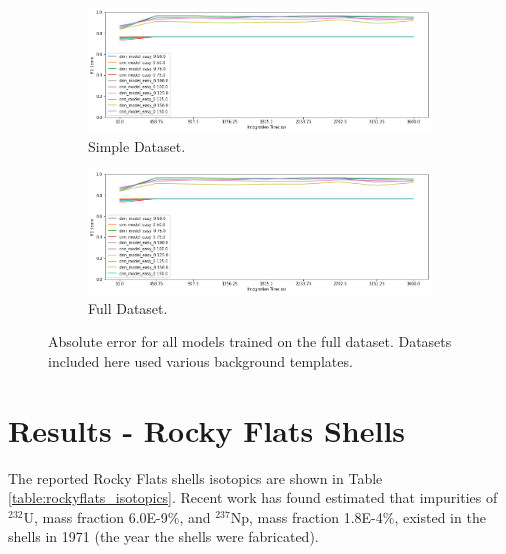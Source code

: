 \begin{figure}[H]
     \centering
     \begin{subfigure}[b]{0.9\textwidth}
         \centering
         \includegraphics[width=\textwidth]{images/results_easy_distance_comparison}
         \caption{Simple Dataset.}
         \label{fig:results_full_background_inject_simple}
     \end{subfigure}

     \begin{subfigure}[b]{0.9\textwidth}
         \centering
         \includegraphics[width=\textwidth]{images/results_easy_distance_comparison}
         \caption{Full Dataset.}
         \label{fig:results_full_background_inject_full}
     \end{subfigure}
        \caption{Absolute error for all models trained on the full dataset. Datasets included here used various background templates.}
        \label{fig:results_full_background_inject}
\end{figure}


\section{Results - Rocky Flats Shells}



The reported Rocky Flats shells isotopics are shown in Table \ref{table:rockyflats_isotopics}. Recent work has found estimated that impurities of $^{232}$U, mass fraction 6.0E-9\%, and $^{237}$Np, mass fraction 1.8E-4\%, \cite{RawoolSullivan2012} existed in the shells in 1971 (the year the shells were fabricated).

